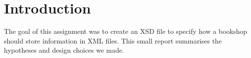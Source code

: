 \section{Introduction}

The goal of this assignment was to create an XSD file to specify how a bookshop
should store information in XML files. This small report summarises the
hypotheses and design choices we made.
